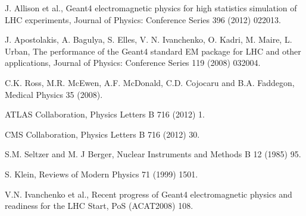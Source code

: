  J. Allison et al., Geant4 electromagnetic physics for
                       high statistics simulation of LHC experiments,
                       Journal of Physics: Conference Series 396 (2012) 022013.

 J. Apostolakis, A. Bagulya, S. Elles, V. N. Ivanchenko, 
                      O. Kadri, M. Maire, L. Urban, The performance of the 
                      Geant4 standard EM package for LHC and other applications,
                      Journal of Physics: Conference Series 119 (2008) 032004.

 C.K. Ross, M.R. McEwen, A.F. McDonald, C.D. Cojocaru and
                      B.A. Faddegon, 
                      Medical Physics 35 (2008). 

 ATLAS Collaboration,
                       Physics Letters B 716 (2012) 1.

 CMS Collaboration,
                       Physics Letters B 716 (2012) 30.

 S.M. Seltzer and M. J Berger,
                        Nuclear Instruments and Methods B 12 (1985) 95.

 S. Klein,
                       Reviews of Modern Physics 71 (1999) 1501.

 V.N. Ivanchenko et al., Recent progress of Geant4 electromagnetic
                   physics and readiness for the LHC Start, PoS (ACAT2008) 108.


